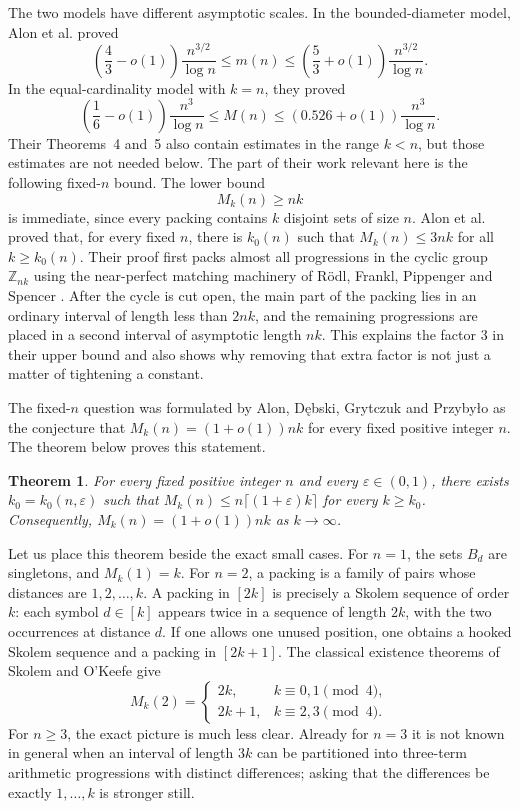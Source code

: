 \documentclass[twoside,12pt]{article}
\numberwithin{equation}{section}
\newtheorem{theorem}{Theorem}[section]
\newcommand{\eps}{\varepsilon}
\begin{document}
The two models have different asymptotic scales.  In the bounded-diameter
model, Alon et al. proved
\[
 \left(\frac43-o(1)\right)\frac{n^{3/2}}{\log n}
 \le m(n)\le
 \left(\frac53+o(1)\right)\frac{n^{3/2}}{\log n}.
\]
In the equal-cardinality model with $k=n$, they proved
\[
 \left(\frac16-o(1)\right)\frac{n^3}{\log n}
 \le M(n)\le
 (0.526+o(1))\frac{n^3}{\log n}.
\]
Their Theorems~4 and~5 also contain estimates in the range $k<n$, but those
estimates are not needed below.  The part of their work relevant here is the
following fixed-$n$ bound.  The lower bound
\begin{equation}\label{eq:lower-bound}
        M_k(n)\ge nk
\end{equation}
is immediate, since every packing contains $k$ disjoint sets of size $n$.
Alon et al. proved that, for every fixed $n$, there is $k_0(n)$ such that
$M_k(n)\le 3nk$ for all $k\ge k_0(n)$.  Their proof first packs almost all
progressions in the cyclic group $\mathbb Z_{nk}$ using the near-perfect
matching machinery of R\"odl, Frankl, Pippenger and Spencer
\cite{FranklRodl,PippengerSpencer,Rodl}.  After the cycle is cut open, the
main part of the packing lies in an ordinary interval of length less than
$2nk$, and the remaining progressions are placed in a second interval of
asymptotic length $nk$.  This explains the factor $3$ in their upper bound and
also shows why removing that extra factor is not just a matter of tightening a
constant.

The fixed-$n$ question was formulated by Alon, D\k{e}bski, Grytczuk and
Przyby\l{}o as the conjecture that $M_k(n)=(1+o(1))nk$ for every fixed
positive integer $n$.  The theorem below proves this statement.

\begin{theorem}\label{thm:main}
For every fixed positive integer $n$ and every $\eps\in(0,1)$, there exists
$k_0=k_0(n,\eps)$ such that $M_k(n)\le n\lceil(1+\eps)k\rceil$ for every
$k\ge k_0$.  Consequently, $M_k(n)=(1+o(1))nk$ as $k\to\infty$.
\end{theorem}

Let us place this theorem beside the exact small cases.  For $n=1$, the sets
$B_d$ are singletons, and $M_k(1)=k$.  For $n=2$, a packing is a family of
pairs whose distances are $1,2,\ldots,k$.  A packing in $[2k]$ is precisely a
Skolem sequence of order $k$: each symbol $d\in[k]$ appears twice in a sequence
of length $2k$, with the two occurrences at distance $d$.  If one allows one
unused position, one obtains a hooked Skolem sequence and a packing in
$[2k+1]$.  The classical existence theorems of Skolem and O'Keefe
\cite{OKeefe1961, Skolem1957} give
\[
 M_k(2)=
 \begin{cases}
  2k,   & k\equiv0,1\pmod4,\\
  2k+1, & k\equiv2,3\pmod4.
 \end{cases}
\]
For $n\ge3$, the exact picture is much less clear.  Already for $n=3$ it is
not known in general when an interval of length $3k$ can be partitioned into
three-term arithmetic progressions with distinct differences; asking that the
differences be exactly $1,\ldots,k$ is stronger still.
\end{document}
